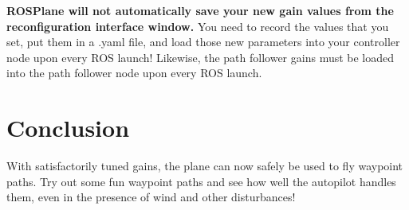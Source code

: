 \documentclass[]{auvsi_doc}
\begin{document}
\textbf{ROSPlane will not automatically save your new gain values from the reconfiguration interface window.} You need to record the values that you set, put them in a .yaml file, and load those new parameters into your controller node upon every ROS launch! Likewise, the path follower gains must be loaded into the path follower node  upon every ROS launch.

\section{Conclusion}

With satisfactorily tuned gains, the plane can now safely be used to fly waypoint paths. Try out some fun waypoint paths and see how well the autopilot handles them, even in the presence of wind and other disturbances!
\end{document}
